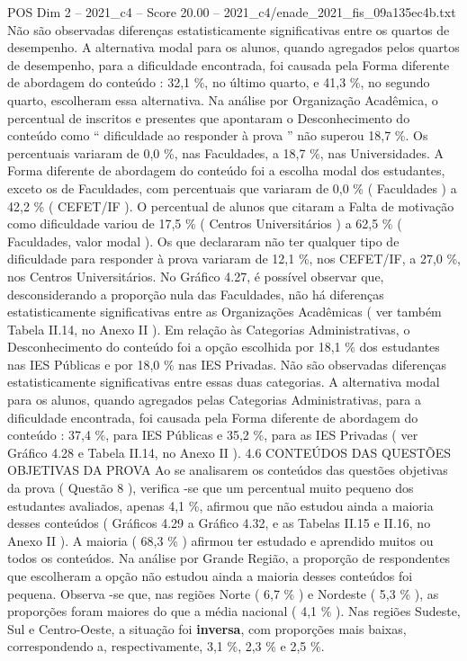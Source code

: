 \begin{textsample}{POS Dim 2 – 2021\_c4 – Score 20.00 – 2021\_c4/enade\_2021\_fis\_09a135ec4b.txt}
Não são observadas diferenças estatisticamente significativas entre os quartos de desempenho.
A alternativa modal para os alunos, quando agregados pelos quartos de desempenho, para a dificuldade encontrada, foi causada pela Forma diferente de abordagem do conteúdo : 32,1 \%, no último quarto, e 41,3 \%, no segundo quarto, escolheram essa alternativa.
Na análise por Organização Acadêmica, o percentual de inscritos e presentes que apontaram o Desconhecimento do conteúdo como “ dificuldade ao responder à prova ” não superou 18,7 \%.
Os percentuais variaram de 0,0 \%, nas Faculdades, a 18,7 \%, nas Universidades.
A Forma diferente de abordagem do conteúdo foi a escolha modal dos estudantes, exceto os de Faculdades, com percentuais que variaram de 0,0 \% ( Faculdades ) a 42,2 \% ( CEFET/IF ).
O percentual de alunos que citaram a Falta de motivação como dificuldade variou de 17,5 \% ( Centros Universitários ) a 62,5 \% ( Faculdades, valor modal ).
Os que declararam não ter qualquer tipo de dificuldade para responder à prova variaram de 12,1 \%, nos CEFET/IF, a 27,0 \%, nos Centros Universitários.
No Gráfico 4.27, é possível observar que, desconsiderando a proporção nula das Faculdades, não há diferenças estatisticamente significativas entre as Organizações Acadêmicas ( ver também Tabela II.14, no Anexo II ).
Em relação às Categorias Administrativas, o Desconhecimento do conteúdo foi a opção escolhida por 18,1 \% dos estudantes nas IES Públicas e por 18,0 \% nas IES Privadas.
Não são observadas diferenças estatisticamente significativas entre essas duas categorias.
A alternativa modal para os alunos, quando agregados pelas Categorias Administrativas, para a dificuldade encontrada, foi causada pela Forma diferente de abordagem do conteúdo : 37,4 \%, para IES Públicas e 35,2 \%, para as IES Privadas ( ver Gráfico 4.28 e Tabela II.14, no Anexo II ). 4.6 CONTEÚDOS DAS QUESTÕES OBJETIVAS DA PROVA Ao se analisarem os conteúdos das questões objetivas da prova ( Questão 8 ), verifica -se que um percentual muito pequeno dos estudantes avaliados, apenas 4,1 \%, afirmou que não estudou ainda a maioria desses conteúdos ( Gráficos 4.29 a Gráfico 4.32, e as Tabelas II.15 e II.16, no Anexo II ).
A maioria ( 68,3 \% ) afirmou ter estudado e aprendido muitos ou todos os conteúdos.
Na análise por Grande Região, a proporção de respondentes que escolheram a opção não estudou ainda a maioria desses conteúdos foi pequena.
Observa -se que, nas regiões Norte ( 6,7 \% ) e Nordeste ( 5,3 \% ), as proporções foram maiores do que a média nacional ( 4,1 \% ).
Nas regiões Sudeste, Sul e Centro-Oeste, a situação foi \textbf{inversa}, com proporções mais baixas, correspondendo a, respectivamente, 3,1 \%, 2,3 \% e 2,5 \%.

\end{textsample}
